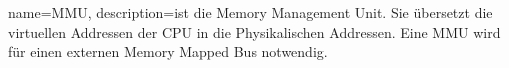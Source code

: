 {
  name=MMU,
  description={ist die Memory Management Unit. Sie übersetzt die virtuellen Addressen der CPU in die Physikalischen Addressen. Eine MMU wird für einen externen Memory Mapped Bus notwendig.}
}